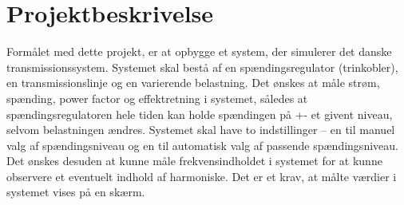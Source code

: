 
\chapter{Projektbeskrivelse}
Formålet med dette projekt, er at opbygge et system, der simulerer det danske transmissionssystem. Systemet skal bestå af en spændingsregulator (trinkobler), en transmissionslinje og en varierende belastning. Det ønskes at måle strøm, spænding, power factor og effektretning i systemet, således at spændingsregulatoren hele tiden kan holde spændingen på +- et givent niveau, selvom belastningen ændres. Systemet skal have to indstillinger – en til manuel valg af spændingsniveau og en til automatisk valg af passende spændingsniveau. 
Det ønskes desuden at kunne måle frekvensindholdet i systemet for at kunne observere et eventuelt indhold af harmoniske. Det er et krav, at målte værdier i systemet vises på en skærm. 

